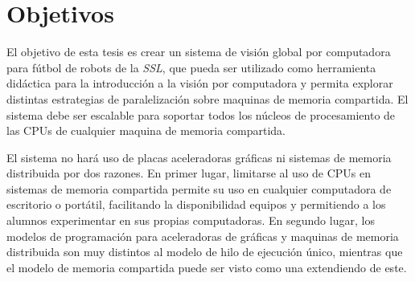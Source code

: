 
\section{Objetivos}

\label{objetivos}

El objetivo de esta tesis es crear un sistema de visión global por computadora
para fútbol de robots de la \emph{SSL}, que pueda ser utilizado como herramienta
didáctica para la introducción a la visión por computadora y permita explorar
distintas estrategias de paralelización sobre maquinas de memoria compartida. El
sistema debe ser escalable para soportar todos los núcleos de procesamiento de
las CPUs de cualquier maquina de memoria compartida.

El sistema no hará uso de placas aceleradoras gráficas ni sistemas de memoria distribuida
por dos razones. En primer lugar, limitarse al uso de CPUs en sistemas de
memoria compartida permite su uso en cualquier computadora de escritorio o
portátil, facilitando la disponibilidad equipos y permitiendo a los alumnos
experimentar en sus propias computadoras. En segundo lugar, los modelos de
programación para aceleradoras de gráficas y maquinas de memoria distribuida son
muy distintos al modelo de hilo de ejecución único, mientras que el modelo de
memoria compartida puede ser visto como una extendiendo de este.
